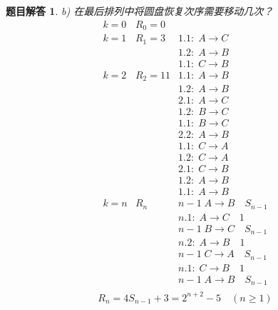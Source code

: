 \documentclass[mode=geye]{elegantnote}
\newtheorem{answer}{题目解答}
\begin{document}
\begin{answer}
	b) 在最后排列中将圆盘恢复次序需要移动几次？
	\begin{equation*}
		\begin{array}{lll}
			k=0	& R_0=0		&	\\
			k=1	& R_1=3		& 1.1:\; A \rightarrow C\\
				&			& 1.2:\; A \rightarrow B\\
				&			& 1.1:\; C \rightarrow B\\
			k=2	& R_2=11	& 1.1:\; A \rightarrow B\\
				&			& 1.2:\; A \rightarrow B\\
				&			& 2.1:\; A \rightarrow C\\
				&			& 1.2:\; B \rightarrow C\\
				&			& 1.1:\; B \rightarrow C\\
				&			& 2.2:\; A \rightarrow B\\
				&			& 1.1:\; C \rightarrow A\\
				&			& 1.2:\; C \rightarrow A\\
				&			& 2.1:\; C \rightarrow B\\
				&			& 1.2:\; A \rightarrow B\\
				&			& 1.1:\; A \rightarrow B\\
			k=n	& R_n 		& n-1\;  			A \rightarrow B\quad S_{n-1}\\
				&			& n.1:\; 			A \rightarrow C\quad 1		\\	
				&			& n-1\; 			B \rightarrow C\quad S_{n-1}\\	
				&			& n.2:\; 			A \rightarrow B\quad 1		\\	
				&			& n-1\; 			C \rightarrow A\quad S_{n-1}\\	
				&			& n.1:\; 			C \rightarrow B\quad 1		\\
				&			& n-1\;  			A \rightarrow B\quad S_{n-1}\\
		\end{array}
	\end{equation*}
\begin{equation*}
	R_n = 4S_{n-1}+3 = 2^{n+2}-5 \quad(n\geqslant 1)
\end{equation*}
	
\end{answer}
\end{document}
